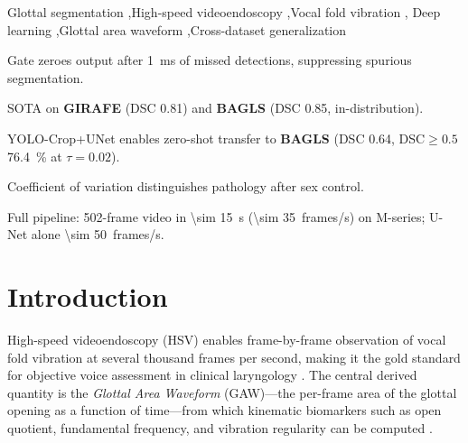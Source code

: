 \documentclass[preprint,12pt]{elsarticle}
\newcommand{\girafe}{\textbf{GIRAFE}}
\newcommand{\bagls}{\textbf{BAGLS}}
\newcommand{\yolocrop}{YOLO-Crop+UNet}
\newcommand{\gaw}{GAW}
\begin{document}
\begin{frontmatter}
\begin{keyword}
Glottal segmentation \sep High-speed videoendoscopy \sep Vocal fold vibration \sep
Deep learning \sep Glottal area waveform \sep Cross-dataset generalization
\end{keyword}

\begin{highlights}
\item Gate zeroes output after \SI{1}{ms} of missed detections, suppressing spurious segmentation.
\item SOTA on \girafe{} (DSC \num{0.81}) and \bagls{} (DSC \num{0.85}, in-distribution).
\item \yolocrop{} enables zero-shot transfer to \bagls{} (DSC \num{0.64}, DSC${\geq}0.5$ \SI{76.4}{\%} at $\tau{=}0.02$).
\item Coefficient of variation distinguishes pathology after sex control.
\item Full pipeline: 502-frame video in \SI{\sim 15}{s} (\SI{\sim 35}{frames/s}) on M-series; U-Net alone \SI{\sim 50}{frames/s}.
\end{highlights}

\end{frontmatter}

\section{Introduction}
\label{sec:intro}

High-speed videoendoscopy (HSV) enables frame-by-frame observation of vocal
fold vibration at several thousand frames per second, making it the gold
standard for objective voice assessment in clinical laryngology
\cite{deliyski2008laryngoscope}.
The central derived quantity is the \emph{Glottal Area Waveform} (\gaw{})---the
per-frame area of the glottal opening as a function of time---from which
kinematic biomarkers such as open quotient, fundamental frequency, and
vibration regularity can be computed \cite{little2007glottal,deliyski2008laryngoscope,lohscheller2008laryngoscope,patel2016nodules}.
\end{document}
